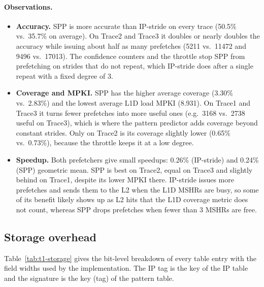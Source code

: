 \documentclass[11pt]{article}
\begin{document}
\paragraph{Observations.}
\begin{itemize}
  \item \textbf{Accuracy.} SPP is more accurate than IP-stride on every trace
        (50.5\% vs.\ 35.7\% on average). On Trace2 and Trace3 it doubles or
        nearly doubles the accuracy while issuing about half as many prefetches
        (5211 vs.\ 11472 and 9496 vs.\ 17013). The confidence counters and the
        throttle stop SPP from prefetching on strides that do not repeat, which
        IP-stride does after a single repeat with a fixed degree of 3.
  \item \textbf{Coverage and MPKI.} SPP has the higher average coverage
        (3.30\% vs.\ 2.83\%) and the lowest average L1D load MPKI (8.931).
        On Trace1 and Trace3 it turns fewer prefetches into more useful ones
        (e.g.\ 3168 vs.\ 2738 useful on Trace3), which is where the pattern
        predictor adds coverage beyond constant strides. Only on Trace2 is its
        coverage slightly lower (0.65\% vs.\ 0.73\%), because the throttle keeps
        it at a low degree.
  \item \textbf{Speedup.} Both prefetchers give small speedups: 0.26\% (IP-stride)
        and 0.24\% (SPP) geometric mean. SPP is best on Trace2, equal on Trace3
        and slightly behind on Trace1, despite its lower MPKI there. IP-stride
        issues more prefetches and sends them to the L2 when the L1D MSHRs are
        busy, so some of its benefit likely shows up as L2 hits that the L1D
        coverage metric does not count, whereas SPP drops prefetches when fewer
        than 3 MSHRs are free.
\end{itemize}

\subsection{Storage overhead}

Table~\ref{tab:t1-storage} gives the bit-level breakdown of every table entry
with the field widths used by the implementation. The IP tag is the key of the
IP table and the signature is the key (tag) of the pattern table.
\end{document}
